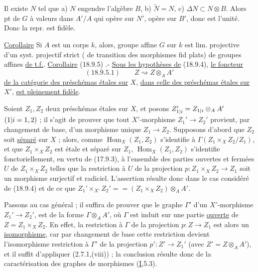 Il existe $N$ tel que a) $N$ engendre l'algèbre $B$, b) $\tilde N=N$, c) $\Delta N\subset N\otimes B$.  Alors   pt de $G$ à valeurs dans $A'/A$ qui opère  sur $N'$, opère  sur $B'$,  donc est  l'unité. Donc la repr. est fidèle.

\uline{Corollaire} Si $A$ est un corps $k$, alors,  groupe affine  $G$ sur $k$ est lim.  projective d'un syst. projectif strict ( de transition des morphismes fid plats) de groupes affines \uline{de t.f.}.
\uline{Corollaire} (18.9.5) .- \uline{Sous les hypothèses de} (18.9.4), \uline{le foncteur}
\[
(18.9.5.1)\qquad Z\rightsquigarrow Z\otimes_A A'
\]
\uline{de la catégorie des préschémas étales sur} $X$, \uline{dans celle des préschémas étales sur} $X'$, \uline{est pleinement fidèle}.

Soient $Z_1,Z_2$ deux préschémas étales sur $X$, et posons $Z_{1|i}'=Z_{1|i}\otimes_A A'$ $(1|i=1,2)$ ;  il s'agit de prouver que tout $X'$-morphisme $Z_1'\to Z_2'$ provient, par changement de base, d'un morphisme unique $Z_1\to Z_2$. Supposons d'abord que  $Z_2$ soit \uline{séparé} sur $X$ ; alors, comme $\operatorname{Hom}_X(Z_1,Z_2)$ s'identifie à  $\Gamma(Z_1\times_X Z_2/Z_1)$, et que $Z_1\times_X Z_2$ est étale et séparé sur $Z_1$, $\operatorname{Hom}_X(Z_1,Z_2)$ s'identifie fonctoriellement, en vertu de (17.9.3), à l'ensemble des parties ouvertes et fermées $U$ de $Z_1\times_X Z_2$ telles que la restriction à $U$ de la projection $p:Z_1\times_X Z_2\to Z_1$ soit un morphisme surjectif et radiciel. L'assertion résulte donc dans le cas considéré de (18.9.4) et de ce que $Z_1'\times_{X'}Z_2'= {}=(Z_1\times_X Z_2)\otimes_A A'$.

Passons au cas général ; il suffira de prouver que le graphe $\Gamma'$ d'un $X'$-morphisme $Z_1'\to Z_2'$,  est de la forme $\Gamma\otimes_A A'$, où $\Gamma$ est  induit sur une partie \uline{ouverte} de $Z=Z_1\times_X Z_2$. En effet, la restriction à $\Gamma$ de la projection $p:Z\to Z_1$ est alors un \uline{isomorphisme}, car par changement de base  cette restriction devient l'isomorphisme restriction à $\Gamma'$ de la projection $p':Z'\to Z_1'$ (avec $Z'=Z\otimes_A A'$), et il suffit d'appliquer (2.7.1,(viii)) ; la conclusion résulte donc  de la caractérisation des graphes de morphismes (\uline{I},5.3).

